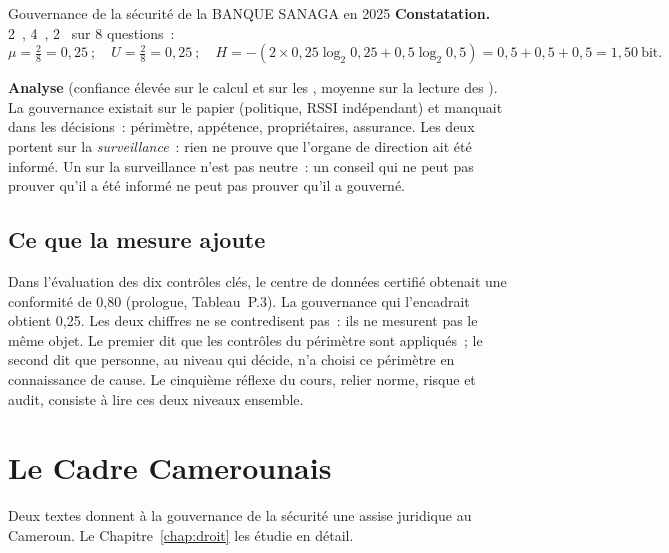 \begin{boxlecture}{Gouvernance de la sécurité de la BANQUE SANAGA en 2025}
\textbf{Constatation.} 2~\OUI{}, 4~\NON{}, 2~\NEK{} sur 8 questions~:
\[
\mu = \tfrac{2}{8} = 0{,}25~;\quad U = \tfrac{2}{8} = 0{,}25~;\quad
H = -\left(2 \times 0{,}25\log_2 0{,}25 + 0{,}5\log_2 0{,}5\right)
  = 0{,}5 + 0{,}5 + 0{,}5 = 1{,}50~\text{bit}.
\]

\textbf{Analyse} (confiance élevée sur le calcul et sur les \NON{},
moyenne sur la lecture des \NEK{}). La gouvernance existait sur le papier
(politique, RSSI indépendant) et manquait dans les décisions~: périmètre,
appétence, propriétaires, assurance. Les deux \NEK{} portent sur la
\emph{surveillance}~: rien ne prouve que l'organe de direction ait été
informé. Un \NEK{} sur la surveillance n'est pas neutre~: un conseil qui
ne peut pas prouver qu'il a été informé ne peut pas prouver qu'il a
gouverné.

\medskip
\hfill{}
\end{boxlecture}

\subsection{Ce que la mesure ajoute}

Dans l'évaluation des dix contrôles clés, le centre de données certifié
obtenait une conformité de 0,80 (prologue, Tableau~P.3). La gouvernance
qui l'encadrait obtient 0,25.
Les deux chiffres ne se contredisent pas~: ils ne mesurent pas le même
objet. Le premier dit que les contrôles du périmètre sont appliqués~; le
second dit que personne, au niveau qui décide, n'a choisi ce périmètre en
connaissance de cause. Le cinquième réflexe du cours, relier norme, risque
et audit, consiste à lire ces deux niveaux ensemble.

\section{Le Cadre Camerounais}
\label{sec:c01-cadre}

Deux textes donnent à la gouvernance de la sécurité une assise juridique
au Cameroun. Le Chapitre~\ref{chap:droit} les étudie en détail.

